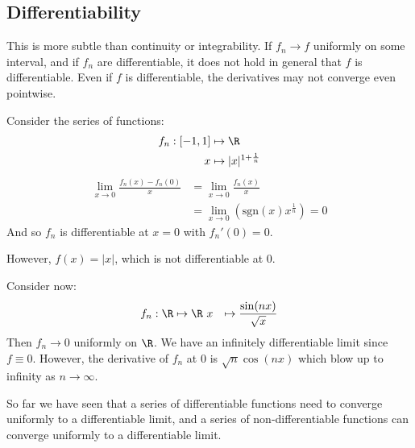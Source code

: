 \documentclass[../Main.tex]{subfiles}
\begin{document}
\subsection{Differentiability}
This is more subtle than continuity or integrability. If $f_n \to f$ uniformly on some interval, and if $f_n$ are differentiable, it does not hold in general that $f$ is differentiable. Even if $f$ is differentiable, the derivatives may not converge even pointwise.
\begin{example}
    Consider the series of functions:
    \begin{align*}
        f_n : [-1, 1] &\mapsto \R \\
        x &\mapsto |x|^{1 + \frac1n}
    \end{align*}
    \begin{align*}
        \lim_{x \to 0} \frac{f_n(x) - f_n(0)}{x} &= \lim_{x \to 0} \frac{f_n(x)}{x} \\
        &= \lim_{x \to 0} \left(\text{sgn}(x) x^{\frac1n}\right) = 0
    \end{align*}
    And so $f_n$ is differentiable at $x = 0$ with $f_n'(0) = 0$.

    However, $f(x) = |x|$, which is not differentiable at $0$.
\end{example}
\begin{example}
    Consider now:
    \begin{align*}
        f_n : \R &\mapsto \R \
        x &\mapsto \frac{\sin(nx)}{\sqrt{x}}
    \end{align*}
    Then $f_n \to 0$ uniformly on $\R$. We have an infinitely differentiable limit since $f \equiv 0$. However, the derivative of $f_n$ at $0$ is $\sqrt{n} \cos(nx)$ which blow up to infinity as $n \to \infty$.
\end{example}
So far we have seen that a series of differentiable functions need to converge uniformly to a differentiable limit, and a series of non-differentiable functions can converge uniformly to a differentiable limit.
\end{document}

